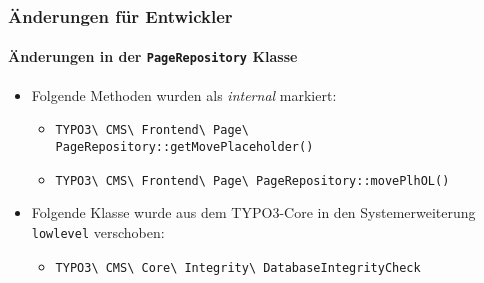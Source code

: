 
\begin{frame}[fragile]
	\frametitle{Änderungen für Entwickler}
	\framesubtitle{Änderungen in der \texttt{PageRepository} Klasse}

	\begin{itemize}
		\item Folgende Methoden wurden als \textit{internal} markiert:

			\begin{itemize}
			\smaller
				\item \texttt{TYPO3\textbackslash
					CMS\textbackslash
					Frontend\textbackslash
					Page\textbackslash
					PageRepository::getMovePlaceholder()}

				\item \texttt{TYPO3\textbackslash
					CMS\textbackslash
					Frontend\textbackslash
					Page\textbackslash
					PageRepository::movePlhOL()}
			\end{itemize}

		\item Folgende Klasse wurde aus dem TYPO3-Core in den
			Systemerweiterung \texttt{lowlevel} verschoben:

			\begin{itemize}
			\smaller
				\item \texttt{TYPO3\textbackslash
					CMS\textbackslash
					Core\textbackslash
					Integrity\textbackslash
					DatabaseIntegrityCheck}
			\end{itemize}

	\end{itemize}

\end{frame}


